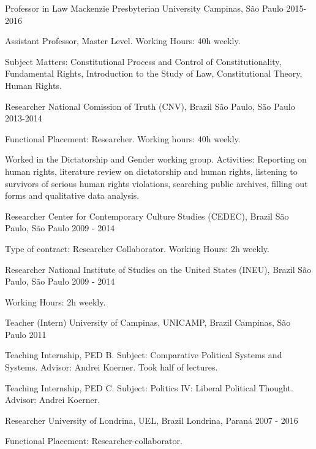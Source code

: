 
\begin{cventries}

\cventry
{Professor in Law}
{Mackenzie Presbyterian University}
{Campinas, São Paulo}
{2015-2016}
{
\begin{cvitems}
  \item Assistant Professor, Master Level. Working Hours: 40h weekly.
  \item Subject Matters: Constitutional Process and Control of Constitutionality, Fundamental Rights, Introduction to the Study of Law, Constitutional Theory, Human Rights.
\end{cvitems}
}

\cventry
{Researcher}
{National Comission of Truth (CNV), Brazil}
{São Paulo, São Paulo}
{2013-2014}
{
\begin{cvitems}
  \item Functional Placement: Researcher. Working hours: 40h weekly.
  \item Worked in the Dictatorship and Gender working group. Activities: Reporting on human rights, literature review on dictatorship and human rights, listening to survivors of serious human rights violations, searching public archives, filling out forms and qualitative data analysis.
\end{cvitems}
}

\cventry
{Researcher}
{Center for Contemporary Culture Studies (CEDEC), Brazil}
{São Paulo, São Paulo}
{2009 - 2014}
{
\begin{cvitems}
  \item Type of contract: Researcher Collaborator. Working Hours: 2h weekly.
\end{cvitems}
}

\cventry
{Researcher}
{National Institute of Studies on the United States (INEU), Brazil}
{São Paulo, São Paulo}
{2009 - 2014}
{
\begin{cvitems}
  \item Working Hours: 2h weekly.
\end{cvitems}
}

\cventry
{Teacher (Intern)}
{University of Campinas, UNICAMP, Brazil}
{Campinas, São Paulo}
{2011}
{
\begin{cvitems}
  \item Teaching Internship, PED B. Subject: Comparative Political Systems and Systems. Advisor: Andrei Koerner. Took half of lectures.
  \item Teaching Internship, PED C. Subject: Politics IV: Liberal Political Thought. Advisor: Andrei Koerner.
\end{cvitems}
}

\cventry
{Researcher}
{University of Londrina, UEL, Brazil}
{Londrina, Paraná}
{2007 - 2016}
{
\begin{cvitems}
  \item Functional Placement: Researcher-collaborator.
\end{cvitems}
}

\end{cventries}
